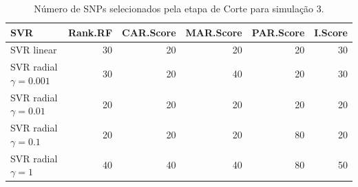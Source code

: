 \begin{table}[ht]
\centering
\begin{tabular}{lrrrrr}
  \hline
SVR & Rank.RF & CAR.Score & MAR.Score & PAR.Score & I.Score \\ 
  \hline
SVR linear & 30 & 20 & 20 & 20 & 30 \\ 
  SVR radial $\gamma = 0.001$ & 30 & 20 & 40 & 20 & 30 \\ 
  SVR radial $\gamma = 0.01$ & 20 & 20 & 20 & 20 & 20 \\ 
  SVR radial $\gamma = 0.1$ & 20 & 20 & 20 & 80 & 20 \\ 
  SVR radial $\gamma = 1$ & 40 & 40 & 40 & 80 & 50 \\ 
   \hline
\end{tabular}
\caption{Número de SNPs selecionados pela etapa de Corte para simulação 3.} 
\end{table}
